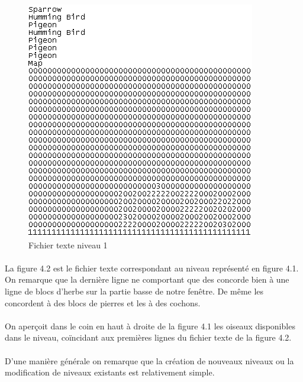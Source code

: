 \documentclass[a4paper,12pt]{report}
\begin{document}
\begin{figure}[H]
\begin{center}
\includegraphics[scale=1]{images/lvl01texte.png} 
\end{center}
\caption{Fichier texte niveau 1}
\label{Fichier texte niveau 1}
\end{figure}

\paragraph{}La figure 4.2 est le fichier texte correspondant au niveau représenté en figure 4.1. On remarque que la dernière ligne ne comportant que des  \guillemotright concorde bien à une ligne de blocs d'herbe sur la partie basse de notre fenêtre. De même les  \guillemotright concordent à des blocs de pierres et les  \guillemotright à des cochons.

\paragraph{}On aperçoit dans le coin en haut à droite de la figure 4.1 les oiseaux disponibles dans le niveau, coïncidant aux premières lignes du fichier texte de la figure 4.2.

\paragraph{}D'une manière générale on remarque que la création de nouveaux niveaux ou la modification de niveaux existants est relativement simple.
\end{document}
